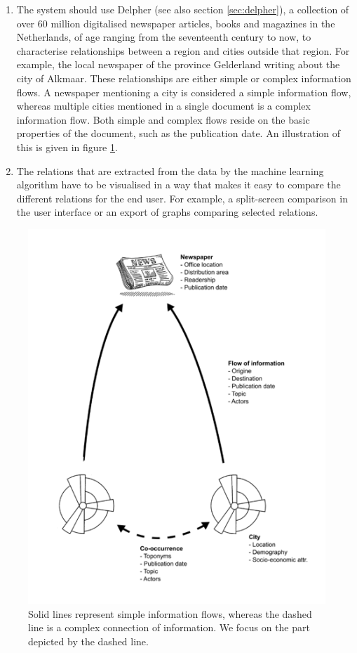 \begin{enumerate}
    \item The system should use Delpher (see also section \ref{sec:delpher}), a collection of over 60 million digitalised newspaper articles, books and magazines in the Netherlands, of age ranging from the seventeenth century to now, to characterise relationships between a region and cities outside that region. For example, the local newspaper of the province Gelderland writing about the city of Alkmaar. These relationships are either simple or complex information flows. A newspaper mentioning a city is considered a simple information flow, whereas multiple cities mentioned in a single document is a complex information flow. Both simple and complex flows reside on the basic properties of the document, such as the publication date. An illustration of this is given in figure \ref{fig:infoflow}.
    \item The relations that are extracted from the data by the machine learning algorithm have to be visualised in a way that makes it easy to compare the different relations for the end user. For example, a split-screen comparison in the user interface or an export of graphs comparing selected relations.
\end{enumerate}
\begin{figure}
    \centering
    \includegraphics{informationflow}
    \caption{Solid lines represent simple information flows, whereas the dashed line is a complex connection of information. We focus on the part depicted by the dashed line.}
    \label{fig:infoflow}
\end{figure}
